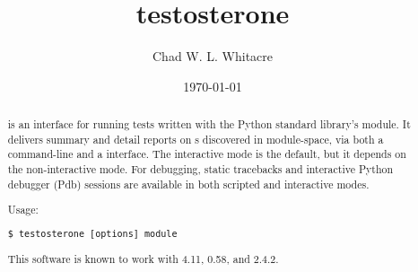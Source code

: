 \documentclass{manual}
\title{testosterone}
\author{Chad W. L. Whitacre}
\date\today
\begin{document}
\maketitle

\begin{abstract}

\noindent

 is an interface for running tests written with the Python
standard library's  module. It delivers summary and detail
reports on s discovered in module-space, via both a command-line
and a  interface. The interactive mode is the default, but it
depends on the non-interactive mode. For debugging, static tracebacks and
interactive Python debugger (Pdb) sessions are available in both scripted and
interactive modes.

Usage:

\begin{verbatim}
$ testosterone [options] module
\end{verbatim}

This software is known to work with 
4.11,  0.58,
and  2.4.2.


\end{abstract}




\end{document}
